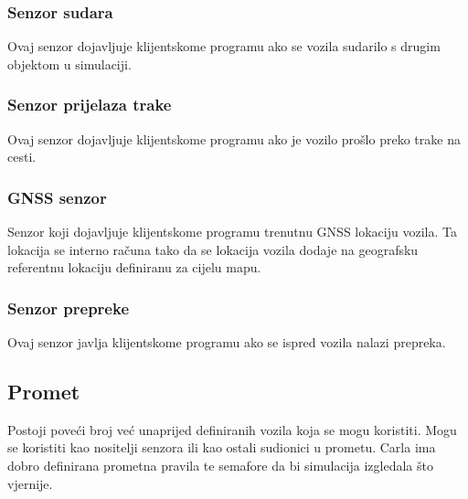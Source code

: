 \subsubsection{Senzor sudara}
Ovaj senzor dojavljuje klijentskome programu ako se vozila sudarilo s drugim objektom u simulaciji.

\subsubsection{Senzor prijelaza trake}
Ovaj senzor dojavljuje klijentskome programu ako je vozilo prošlo preko trake na cesti.

\subsubsection{GNSS senzor}
Senzor koji dojavljuje klijentskome programu trenutnu GNSS lokaciju vozila. Ta lokacija se interno računa tako da se lokacija vozila dodaje na geografsku referentnu lokaciju definiranu za cijelu mapu.

\subsubsection{Senzor prepreke}
Ovaj senzor javlja klijentskome programu ako se ispred vozila nalazi prepreka.

\subsection{Promet}
Postoji poveći broj već unaprijed definiranih vozila koja se mogu koristiti. Mogu se koristiti kao nositelji senzora ili kao ostali sudionici u prometu. Carla ima dobro definirana prometna pravila te semafore da bi simulacija izgledala što vjernije.